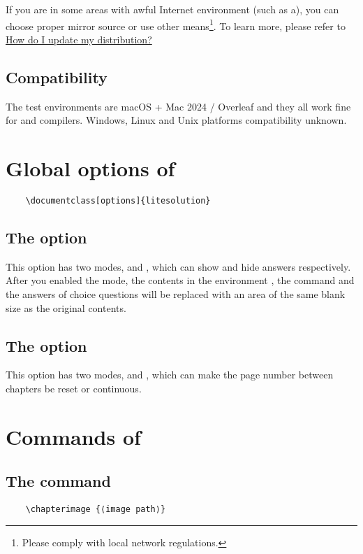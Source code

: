 \documentclass[ans]{litesolution}
\begin{document}
If you are in some areas with awful Internet environment (such as a), you can choose proper mirror source or use other means\footnote{Please comply with local network regulations.}. To learn more, please refer to \href{https://tex.stackexchange.com/questions/55437/how-do-i-update-my-tex-distribution}{How do I update my  distribution?}

\subsection{Compatibility}
The test environments are macOS + Mac 2024 / Overleaf and they all work fine for  and  compilers. Windows, Linux and Unix platforms compatibility unknown.

\clearpage

\section{Global options of }
\begin{verbatim}
    \documentclass[options]{litesolution}
\end{verbatim}
\subsection{The  option}
This option has two modes,  and , which can show and hide answers respectively. After you enabled the  mode, the contents in the environment , the command  and the answers of choice questions will be replaced with an area of the same blank size as the original contents.

\subsection{The  option}
This option has two modes,  and , which can make the page number between chapters be reset or continuous.

\section{Commands of }
\subsection{The  command}
\begin{verbatim}
    \chapterimage {⟨image path⟩}
\end{verbatim}
\end{document}
